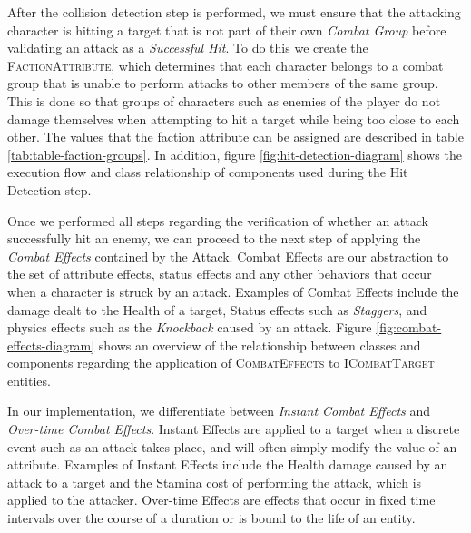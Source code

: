 After the collision detection step is performed, we must ensure that the attacking character is hitting a target that is not part of their own \emph{Combat Group} before validating an attack as a \emph{Successful Hit}. To do this we create the \textsc{FactionAttribute}, which determines that each character belongs to a combat group that is unable to perform attacks to other members of the same group. This is done so that groups of characters such as enemies of the player do not damage themselves when attempting to hit a target while being too close to each other. The values that the faction attribute can be assigned are described in table \ref{tab:table-faction-groups}. In addition, figure \ref{fig:hit-detection-diagram} shows the execution flow and class relationship of components used during the Hit Detection step.





Once we performed all steps regarding the verification of whether an attack successfully hit an enemy, we can proceed to the next step of applying the \emph{Combat Effects} contained by the Attack. Combat Effects are our abstraction to the set of attribute effects, status effects and any other behaviors that occur when a character is struck by an attack. Examples of Combat Effects include the damage dealt to the Health of a target, Status effects such as \emph{Staggers}, and physics effects such as the \emph{Knockback} caused by an attack. Figure \ref{fig:combat-effects-diagram} shows an overview of the relationship between classes and components regarding the application of \textsc{CombatEffects} to \textsc{ICombatTarget} entities.



In our implementation, we differentiate between \emph{Instant Combat Effects} and \emph{Over-time Combat Effects}. Instant Effects are applied to a target when a discrete event such as an attack takes place, and will often simply modify the value of an attribute. Examples of Instant Effects include the Health damage caused by an attack to a target and the Stamina cost of performing the attack, which is applied to the attacker. Over-time Effects are effects that occur in fixed time intervals over the course of a duration or is bound to the life of an entity.

